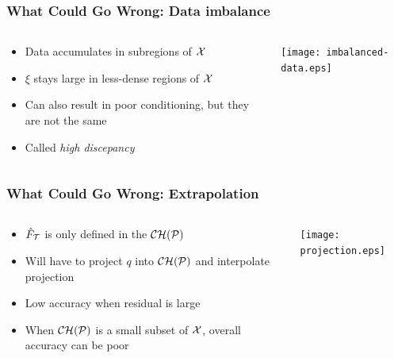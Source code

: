 \documentclass[aspectratio=169]{beamer}
\begin{document}
\begin{frame}\frametitle{What Could Go Wrong: Data imbalance}
\begin{columns}
\begin{column}{0.6\textwidth}
\begin{itemize}
\pause
\item Data accumulates in subregions of ${\cal X}$
\item {\color{red} $\xi$ stays large in less-dense regions of ${\cal X}$}
\item Can also result in poor conditioning, but they are not the same
\item Called {\it high discepancy}
\end{itemize}
\end{column}
\begin{column}{0.4\textwidth}
\texttt{[image: imbalanced-data.eps]}
\end{column}
\end{columns}
\end{frame}

\begin{frame}\frametitle{What Could Go Wrong: Extrapolation}
\begin{columns}
\begin{column}{0.6\textwidth}
\begin{itemize}
\pause
\item ${\hat F}_{\cal T}$ is only defined in the ${\cal CH}({\cal P})$
\item Will have to project $q$ into ${\cal CH}({\cal P})$ and interpolate
projection
\item {\color{red} Low accuracy when residual is large}
\item When ${\cal CH}({\cal P})$ is a small subset of ${\cal X}$,
overall accuracy can be poor
\end{itemize}
\end{column}
\begin{column}{0.4\textwidth}
\texttt{[image: projection.eps]}
\end{column}
\end{columns}
\end{frame}
\end{document}
